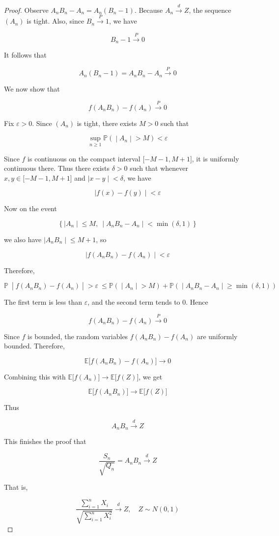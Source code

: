 \documentclass{qlnotes-export}
\begin{document}
\begin{proof}
Observe \(A_{n}B_{n} - A_{n} = A_{n}(B_{n} - 1)\). Because \(A_{n}\overset{d}{\rightarrow}Z\), the sequence \((A_{n})\) is tight. Also, since \(B_{n}\overset{P}{\rightarrow}1\), we have

\[B_{n} - 1\overset{P}{\rightarrow}0\]

It follows that

\[A_{n}(B_{n} - 1) = A_{n}B_{n} - A_{n}\overset{P}{\rightarrow}0\]

We now show that

\[f(A_{n}B_{n}) - f(A_{n})\overset{P}{\rightarrow}0\]

Fix \(\varepsilon > 0\). Since \((A_{n})\) is tight, there exists \(M > 0\) such that

\[\left. \sup\limits_{n \geq 1}{\mathbb{P}}( \middle| A_{n} \middle| > M) < \varepsilon \right.\]

Since \(f\) is continuous on the compact interval \(\lbrack - M - 1,M + 1\rbrack\), it is uniformly continuous there. Thus there exists \(\delta > 0\) such that whenever \(x,y \in \lbrack - M - 1,M + 1\rbrack\) and \(\left. |x - y \middle| < \delta \right.\), we have

\[\left. |f(x) - f(y) \middle| < \varepsilon \right.\]

Now on the event

\[\left\{ |A_{n} \middle| \leq M,\  \middle| A_{n}B_{n} - A_{n} \middle| < \min(\delta,1) \right\}\]

we also have \(\left. |A_{n}B_{n} \middle| \leq M + 1 \right.\), so

\[\left. |f(A_{n}B_{n}) - f(A_{n}) \middle| < \varepsilon \right.\]

Therefore,

\[\left. {\mathbb{P}}\  \middle| f(A_{n}B_{n}) - f(A_{n}) \middle| > \varepsilon\  \leq {\mathbb{P}}( \middle| A_{n} \middle| > M) + {\mathbb{P}}( \middle| A_{n}B_{n} - A_{n} \middle| \geq \min(\delta,1)) \right.\]

The first term is less than \(\varepsilon\), and the second term tends to \(0\). Hence

\[f(A_{n}B_{n}) - f(A_{n})\overset{P}{\rightarrow}0\]

Since \(f\) is bounded, the random variables \(f(A_{n}B_{n}) - f(A_{n})\) are uniformly bounded. Therefore,

\[{\mathbb{E}}\lbrack f(A_{n}B_{n}) - f(A_{n})\rbrack\rightarrow 0\]

Combining this with \({\mathbb{E}}\lbrack f(A_{n})\rbrack\rightarrow{\mathbb{E}}\lbrack f(Z)\rbrack\), we get

\[{\mathbb{E}}\lbrack f(A_{n}B_{n})\rbrack\rightarrow{\mathbb{E}}\lbrack f(Z)\rbrack\]

Thus

\[A_{n}B_{n}\overset{d}{\rightarrow}Z\]

This finishes the proof that

\[\frac{S_{n}}{\sqrt{Q_{n}}} = A_{n}B_{n}\overset{d}{\rightarrow}Z\]

That is,

\[\frac{\sum_{i = 1}^{n}X_{i}}{\sqrt{\sum_{i = 1}^{n}X_{i}^{2}}}\overset{d}{\rightarrow}Z,\quad Z \sim N(0,1)\]

\end{proof}

\printbibliography
\end{document}
